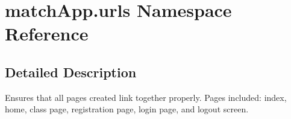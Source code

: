 \hypertarget{namespacematch_app_1_1urls}{}\section{match\+App.\+urls Namespace Reference}
\label{namespacematch_app_1_1urls}


\subsection{Detailed Description}
\begin{DoxyVerb}Ensures that all pages created link together properly.
Pages included: index, home, class page, registration page, login page, and logout screen. 
\end{DoxyVerb}
 